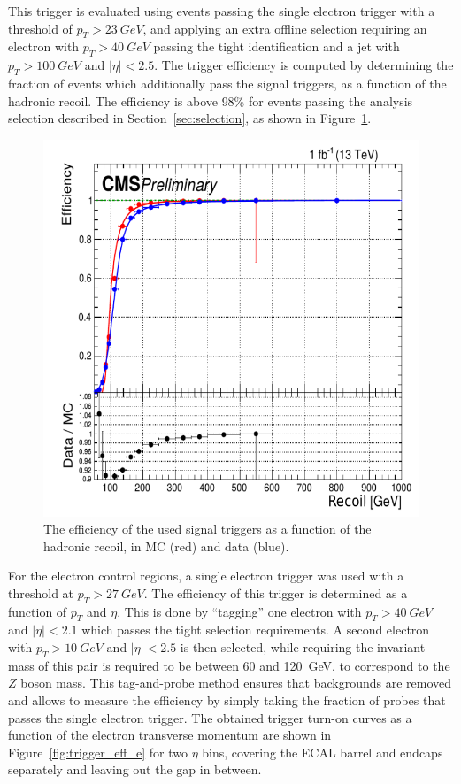 This trigger is evaluated using events passing the single electron trigger with a threshold of $p_T > \SI{23}{GeV}$, and applying an extra offline selection requiring an electron with $p_T > \SI{40}{GeV}$ passing the tight identification and a jet with $p_T > \SI{100}{GeV}$ and $|\eta| < 2.5$. The trigger efficiency is computed by determining the fraction of events which additionally pass the signal triggers, as a function of the hadronic recoil. The efficiency is above 98\% for events passing the analysis selection described in Section~\ref{sec:selection}, as shown in Figure~\ref{fig:trigger_eff}.

\begin{figure}[ht]
  \centering
 \includegraphics[width=.61\textwidth]{monojet_trigger.png} 
 \caption{The efficiency of the used signal triggers as a function of the hadronic recoil, in MC (red) and data (blue).}
 \label{fig:trigger_eff}
\end{figure}

For the electron control regions, a single electron trigger was used with a threshold at $p_T > \SI{27}{GeV}$. The efficiency of this trigger is determined as a function of $p_T$ and $\eta$. This is done by ``tagging'' one electron with $p_T > \SI{40}{GeV}$ and $|\eta| < 2.1$ which passes the tight selection requirements. A second electron with $p_T > \SI{10}{GeV}$ and $|\eta| < 2.5$ is then selected, while requiring the invariant mass of this pair is required to be between 60 and \SI{120}{GeV}, to correspond to the $Z$ boson mass. This tag-and-probe method ensures that backgrounds are removed and allows to measure the efficiency by simply taking the fraction of probes that passes the single electron trigger. The obtained trigger turn-on curves as a function of the electron transverse momentum are shown in Figure~\ref{fig:trigger_eff_e} for two $\eta$ bins, covering the \ac{ECAL} barrel and endcaps separately and leaving out the gap in between.

